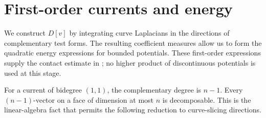 \documentclass[11pt,reqno]{amsart}
\theoremstyle{definition}
\newtheorem{definition}[theorem]{Definition}
\theoremstyle{remark}
\numberwithin{equation}{section}
\begin{document}
\enlargethispage{\baselineskip}
\begingroup
\footnotesize
\noindent\begin{minipage}{\textwidth}
\tableofcontents
\end{minipage}
\endgroup

\section{First-order currents and energy}\label{sec:first-order}

We construct $D[v]$ by integrating curve Laplacians in the directions
of complementary test forms. The resulting coefficient measures allow
us to form the quadratic energy expressions for bounded potentials.
These first-order expressions supply the contact estimate in
; no higher product of discontinuous
potentials is used at this stage.


For a current of bidegree $(1,1)$, the complementary degree is $n-1$.
Every $(n-1)$-vector on a face of dimension at most $n$
is decomposable. This is the linear-algebra fact that permits the
following reduction to curve-slicing directions.
\end{document}
